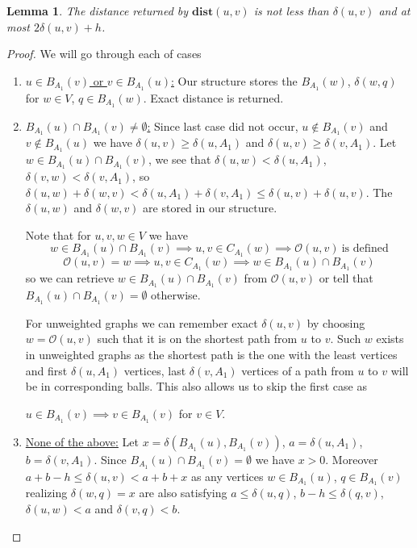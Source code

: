 \documentclass[shortabstract, lic, english]{iithesis}
\theoremstyle{definition} \newtheorem{definition}{Definition}[chapter]
\theoremstyle{plain} \newtheorem{remark}[definition]{Observation}
\theoremstyle{plain} \newtheorem{theorem}[definition]{Theorem}
\theoremstyle{plain} \newtheorem{lemma}[definition]{Lemma}
\theoremstyle{plain} \newtheorem{conjecture}[definition]{Conjecture}
\begin{document}
\begin{lemma}
    The distance returned by $\mathbf{dist}(u, v)$ is not less than $\delta(u,v)$ and at most $2 \delta(u,v) + h$.
\end{lemma}
\begin{proof}
    We will go through each of cases
    \begin{enumerate}
        \item \underline{$u \in B_{A_1}(v)$ or $v \in B_{A_1}(u)$:}\newline
            Our structure stores the $B_{A_1}(w)$, $\delta(w, q)$ for $w \in V$, $q \in B_{A_1}(w)$. Exact distance is returned.
        \item \underline{$B_{A_1}(u) \cap B_{A_1}(v) \neq \emptyset$:}\newline
            Since last case did not occur, $u \notin B_{A_1}(v)$ and $v \notin B_{A_1}(u)$ we have $\delta(u,v) \geq \delta(u, A_1)$ and $\delta(u,v) \geq \delta(v, A_1)$.
            Let $w \in B_{A_1}(u) \cap B_{A_1}(v)$, we see that $\delta(u, w) < \delta(u, A_1)$, $\delta(v, w) < \delta(v, A_1)$,
            so $\delta(u, w) + \delta(w, v) < \delta(u, A_1) + \delta(v, A_1) \leq \delta(u,v) + \delta(u,v)$.
            The $\delta(u, w)$ and $\delta(w, v)$ are stored in our structure.
            
            Note that for $u,v,w \in V$ we have
            $$w \in B_{A_1}(u) \cap B_{A_1}(v) \implies u,v \in C_{A_1}(w) \implies \mathcal{O}(u,v)~\text{is defined}$$
            $$\mathcal{O}(u, v) = w \implies u,v \in C_{A_1}(w) \implies w \in B_{A_1}(u) \cap B_{A_1}(v)$$
            so we can retrieve $w \in B_{A_1}(u) \cap B_{A_1}(v)$ from $\mathcal{O}(u,v)$ or tell that $B_{A_1}(u) \cap B_{A_1}(v) = \emptyset$ otherwise.

            For unweighted graphs we can remember exact $\delta(u, v)$ by choosing $w = \mathcal{O}(u,v)$ such that it is on the shortest path from $u$ to $v$.
            Such $w$ exists in unweighted graphs as the shortest path is the one with the least vertices and first $\delta(u, A_1)$ vertices, last $\delta(v, A_1)$ vertices of a path from $u$ to $v$ will be in corresponding balls.
            This also allows us to skip the first case as

            $u \in B_{A_1}(v) \implies v \in B_{A_1}(v)$ for $v \in V$.
        \item \underline{None of the above:}\newline
            Let $x = \delta(B_{A_1}(u), B_{A_1}(v))$, $a = \delta(u, A_1)$, $b = \delta(v, A_1)$.
            Since $B_{A_1}(u) \cap B_{A_1}(v) = \emptyset$ we have $x > 0$.
            Moreover $a + b - h \leq \delta(u,v) < a + b + x$ as any vertices $w \in B_{A_1}(u)$, $q \in B_{A_1}(v)$ realizing
            $\delta(w, q) = x$ are also satisfying $a \leq \delta(u, q)$, $b - h \leq \delta(q, v)$, $\delta(u, w) < a$ and $\delta(v, q) < b$.


\end{enumerate}
\end{proof}
\end{document}

